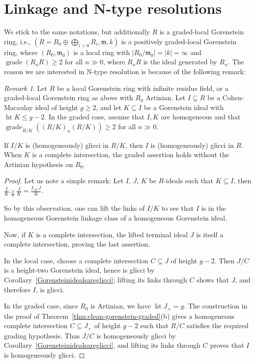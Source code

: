 \documentclass[11pt,letterpaper]{amsart}
\newcommand{\seq}{\subseteq}
\DeclareMathOperator{\gr}{grade}
\theoremstyle{plain}
\theoremstyle{definition}
\theoremstyle{remark}
\newtheorem{remark}[thm]{Remark}
\begin{document}
\section{Linkage and N-type resolutions}

We stick to the same notations, but additionally $R$ is a graded-local Gorenstein ring, i.e., $(R=R_0\oplus\bigoplus_{i>0} R_i,\mathfrak m,k)$ is a positively graded-local Gorenstein ring, where $(R_0,\mathfrak m_0)$ is a local ring with $|R_0/\mathfrak m_0|=|k|=\infty$ and $\gr(R_nR)\ge 2$ for all $n\gg 0$, where $R_nR$ is the ideal generated by $R_n$. The reason we are interested in N-type resolution is because of the following remark:

\begin{remark}\label{rmk:heightcutglicci}
Let $R$ be a local Gorenstein ring with infinite residue field, or a graded-local Gorenstein ring as above with $R_0$ Artinian. Let $I\subsetneq R$ be a Cohen-Macaulay ideal of height $g\geq2$, and let $K\subseteq I$ be a Gorenstein ideal with $\operatorname{ht}K\leq g-2$. In the graded case, assume that $I,K$ are homogeneous and that $\operatorname{grade}_{R/K}((R/K)_n(R/K))\geq2$ for all $n\gg0$.

If $I/K$ is (homogeneously) glicci in $R/K$, then $I$ is (homogeneously) glicci in $R$. When $K$ is a complete intersection, the graded assertion holds without the Artinian hypothesis on $R_0$.
\end{remark}

\begin{proof}
Let us note a simple remark:  Let $I$, $J$, $K$ be $R$-ideals such that $K\seq I$, then $\frac{I}{K}:_{\frac{R}{K}} \frac{J}{K}=\frac{I:_R J}{K}$.

So by this observation, one can lift the links of $I/K$ to see that $I$ is in the homogeneous Gorenstein linkage class of a homogeneous Gorenstein ideal. 

Now, if $K$ is a complete intersection, the lifted terminal ideal $J$ is itself a complete intersection, proving the last assertion.

In the local case, choose a complete intersection $C\subseteq J$ of height $g-2$. Then $J/C$ is a height-two Gorenstein ideal, hence is glicci by Corollary~\ref{Gorensteinidealsareglicci}; lifting its links through $C$ shows that $J$, and therefore $I$, is glicci.

In the graded case, since $R_0$ is Artinian, we have $\operatorname{ht}J_+=g$. The construction in the proof of Theorem~\ref{thm:clean-gorenstein-graded}(b) gives a homogeneous complete intersection $C\subseteq J_+$ of height $g-2$ such that $R/C$ satisfies the required grading hypothesis. Thus $J/C$ is homogeneously glicci by Corollary~\ref{Gorensteinidealsareglicci}, and lifting its links through $C$ proves that $I$ is homogeneously glicci.

\end{proof}
\end{document}
